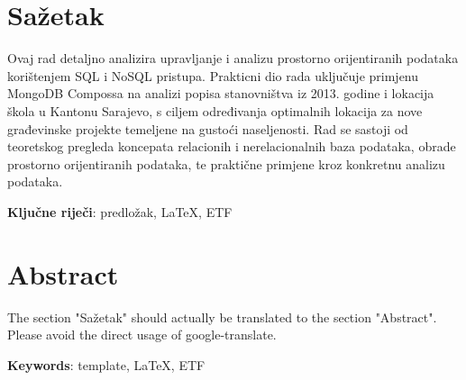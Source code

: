 \pagebreak

\section*{Sažetak}

Ovaj rad detaljno analizira upravljanje i analizu prostorno orijentiranih podataka korištenjem SQL i NoSQL pristupa. Prakticni dio rada uključuje primjenu MongoDB Compossa na analizi popisa stanovništva iz 2013. godine i lokacija škola u Kantonu Sarajevo, s ciljem određivanja optimalnih lokacija za nove građevinske projekte temeljene na gustoći naseljenosti. Rad se sastoji od teoretskog pregleda koncepata relacionih i nerelacionalnih baza podataka, obrade prostorno orijentiranih podataka, te praktične primjene kroz konkretnu analizu podataka.

\vspace{1cm}
\textbf{Ključne riječi}:  predložak, \LaTeX, ETF

\section*{Abstract}

The section "Sažetak" should actually be translated to the section "Abstract". Please avoid the direct usage of google-translate.  

\vspace{1cm}
\textbf{Keywords}:  template, \LaTeX , ETF